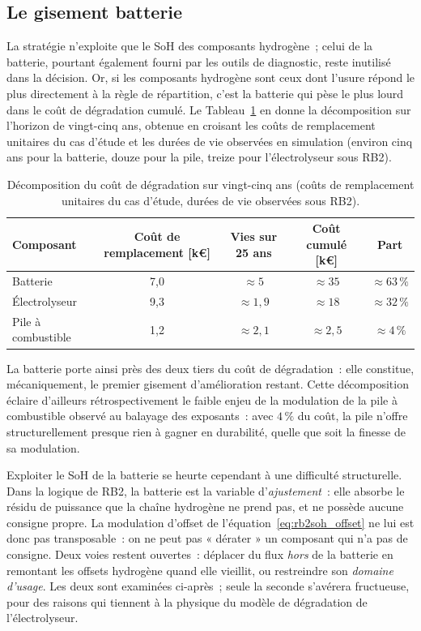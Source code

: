 \subsection{Le gisement batterie}
\label{subsec:gisement_batterie}

La stratégie \RBsohH{} n'exploite que le SoH des composants hydrogène~; celui de la batterie, pourtant également fourni par les outils de diagnostic, reste inutilisé dans la décision. Or, si les composants hydrogène sont ceux dont l'usure répond le plus directement à la règle de répartition, c'est la batterie qui pèse le plus lourd dans le coût de dégradation cumulé. Le Tableau~\ref{tab:decomposition_deg} en donne la décomposition sur l'horizon de vingt-cinq ans, obtenue en croisant les coûts de remplacement unitaires du cas d'étude et les durées de vie observées en simulation (environ cinq ans pour la batterie, douze pour la pile, treize pour l'électrolyseur sous RB2).

\begin{table}[h!]
\centering
\caption{Décomposition du coût de dégradation sur vingt-cinq ans (coûts de remplacement unitaires du cas d'étude, durées de vie observées sous RB2).}
\label{tab:decomposition_deg}
\begin{tabular}{lcccc}
\hline
Composant & Coût de remplacement [k€] & Vies sur 25 ans & Coût cumulé [k€] & Part \\
\hline
Batterie        & 7,0  & $\approx 5$   & $\approx 35$  & $\approx 63\,\%$ \\
Électrolyseur   & 9,3  & $\approx 1,9$ & $\approx 18$  & $\approx 32\,\%$ \\
Pile à combustible & 1,2 & $\approx 2,1$ & $\approx 2,5$ & $\approx 4\,\%$ \\
\hline
\end{tabular}
\end{table}

La batterie porte ainsi près des deux tiers du coût de dégradation~: elle constitue, mécaniquement, le premier gisement d'amélioration restant. Cette décomposition éclaire d'ailleurs rétrospectivement le faible enjeu de la modulation de la pile à combustible observé au balayage des exposants~: avec $4\,\%$ du coût, la pile n'offre structurellement presque rien à gagner en durabilité, quelle que soit la finesse de sa modulation.

Exploiter le SoH de la batterie se heurte cependant à une difficulté structurelle. Dans la logique de RB2, la batterie est la variable d'\emph{ajustement}~: elle absorbe le résidu de puissance que la chaîne hydrogène ne prend pas, et ne possède aucune consigne propre. La modulation d'offset de l'équation~\eqref{eq:rb2soh_offset} ne lui est donc pas transposable~: on ne peut pas « dérater » un composant qui n'a pas de consigne. Deux voies restent ouvertes~: déplacer du flux \emph{hors} de la batterie en remontant les offsets hydrogène quand elle vieillit, ou restreindre son \emph{domaine d'usage}. Les deux sont examinées ci-après~; seule la seconde s'avérera fructueuse, pour des raisons qui tiennent à la physique du modèle de dégradation de l'électrolyseur.


